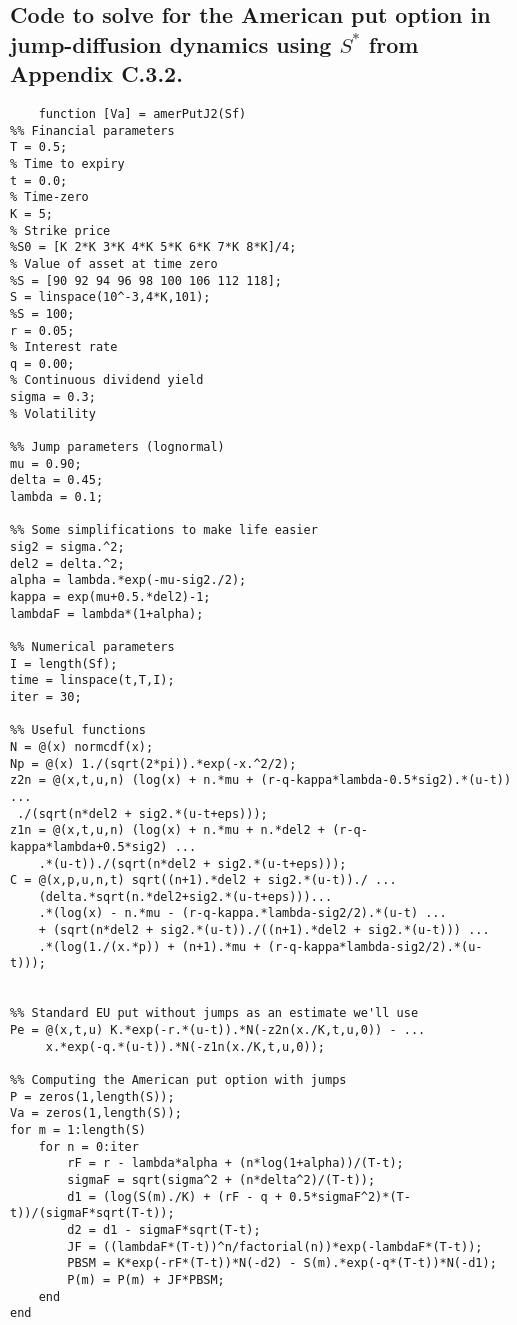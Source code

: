 \subsection{Code to solve for the American put option in jump-diffusion dynamics using $S^*$ from Appendix C.3.2.}
\begin{lstlisting}
    function [Va] = amerPutJ2(Sf)
%% Financial parameters
T = 0.5;                                                                     % Time to expiry
t = 0.0;                                                                     % Time-zero 
K = 5;                                                                     % Strike price
%S0 = [K 2*K 3*K 4*K 5*K 6*K 7*K 8*K]/4;                                      % Value of asset at time zero
%S = [90 92 94 96 98 100 106 112 118];
S = linspace(10^-3,4*K,101);
%S = 100;
r = 0.05;                                                                    % Interest rate
q = 0.00;                                                                    % Continuous dividend yield
sigma = 0.3;                                                                 % Volatility

%% Jump parameters (lognormal)
mu = 0.90;
delta = 0.45;
lambda = 0.1;

%% Some simplifications to make life easier
sig2 = sigma.^2;
del2 = delta.^2;
alpha = lambda.*exp(-mu-sig2./2);
kappa = exp(mu+0.5.*del2)-1;
lambdaF = lambda*(1+alpha);

%% Numerical parameters
I = length(Sf);
time = linspace(t,T,I);
iter = 30;

%% Useful functions
N = @(x) normcdf(x);
Np = @(x) 1./(sqrt(2*pi)).*exp(-x.^2/2);
z2n = @(x,t,u,n) (log(x) + n.*mu + (r-q-kappa*lambda-0.5*sig2).*(u-t)) ... 
 ./(sqrt(n*del2 + sig2.*(u-t+eps)));
z1n = @(x,t,u,n) (log(x) + n.*mu + n.*del2 + (r-q-kappa*lambda+0.5*sig2) ...
    .*(u-t))./(sqrt(n*del2 + sig2.*(u-t+eps)));
C = @(x,p,u,n,t) sqrt((n+1).*del2 + sig2.*(u-t))./ ...
    (delta.*sqrt(n.*del2+sig2.*(u-t+eps)))...
    .*(log(x) - n.*mu - (r-q-kappa.*lambda-sig2/2).*(u-t) ...
    + (sqrt(n*del2 + sig2.*(u-t))./((n+1).*del2 + sig2.*(u-t))) ...
    .*(log(1./(x.*p)) + (n+1).*mu + (r-q-kappa*lambda-sig2/2).*(u-t)));


%% Standard EU put without jumps as an estimate we'll use
Pe = @(x,t,u) K.*exp(-r.*(u-t)).*N(-z2n(x./K,t,u,0)) - ...
     x.*exp(-q.*(u-t)).*N(-z1n(x./K,t,u,0));

%% Computing the American put option with jumps
P = zeros(1,length(S));
Va = zeros(1,length(S));
for m = 1:length(S)
    for n = 0:iter
        rF = r - lambda*alpha + (n*log(1+alpha))/(T-t);
        sigmaF = sqrt(sigma^2 + (n*delta^2)/(T-t));
        d1 = (log(S(m)./K) + (rF - q + 0.5*sigmaF^2)*(T-t))/(sigmaF*sqrt(T-t));
        d2 = d1 - sigmaF*sqrt(T-t);
        JF = ((lambdaF*(T-t))^n/factorial(n))*exp(-lambdaF*(T-t));
        PBSM = K*exp(-rF*(T-t))*N(-d2) - S(m).*exp(-q*(T-t))*N(-d1);
        P(m) = P(m) + JF*PBSM;
    end
end


\end{lstlisting}
